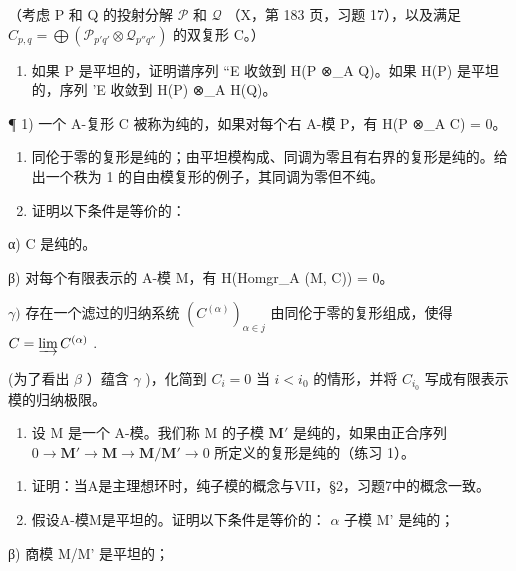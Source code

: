 （考虑 P 和 Q 的投射分解 \(\mathcal{P}\) 和 \(\mathcal{Q}\) （X，第 183 页，习题 17），以及满足 \(C_{p,q} = \bigoplus (\mathcal{P}_{p'q'} \otimes \mathcal{Q}_{p''q''})\) 的双复形 C。）

\begin{enumerate}
\def\labelenumi{\alph{enumi})}
\setcounter{enumi}{1}
\tightlist
\item
  如果 P 是平坦的，证明谱序列 ``E 收敛到 H(P ⊗\_A Q)。如果 H(P) 是平坦的，序列 'E 收敛到 H(P) ⊗\_A H(Q)。
\end{enumerate}


¶ 1) 一个 A-复形 C 被称为纯的，如果对每个右 A-模 P，有 H(P ⊗\_A C) = 0。

\begin{enumerate}
\def\labelenumi{\alph{enumi})}
\item
  同伦于零的复形是纯的；由平坦模构成、同调为零且有右界的复形是纯的。给出一个秩为 1 的自由模复形的例子，其同调为零但不纯。
\item
  证明以下条件是等价的：
\end{enumerate}

α) C 是纯的。

β) 对每个有限表示的 A-模 M，有 H(Homgr\_A (M, C)) = 0。

\(\gamma)\) 存在一个滤过的归纳系统 \((C^{(\alpha)})_{\alpha \in j}\) 由同伦于零的复形组成，使得 \(C = \varinjlim C^{(\alpha)}\) .

(为了看出 \(\beta\) ）蕴含 \(\gamma\) )，化简到 \(C_i = 0\) 当 \(i < i_0\) 的情形，并将 \(C_{i_0}\) 写成有限表示模的归纳极限。

\begin{enumerate}
\def\labelenumi{\arabic{enumi})}
\setcounter{enumi}{1}
\tightlist
\item
  设 M 是一个 A-模。我们称 M 的子模 \(\mathbf{M}'\) 是纯的，如果由正合序列 \(0 \to \mathbf{M}' \to \mathbf{M} \to \mathbf{M} / \mathbf{M}' \to 0\) 所定义的复形是纯的（练习 1）。
\end{enumerate}

\begin{enumerate}
\def\labelenumi{\alph{enumi})}
\item
  证明：当A是主理想环时，纯子模的概念与VII，§2，习题7中的概念一致。
\item
  假设A-模M是平坦的。证明以下条件是等价的： \(\alpha\) 子模 M' 是纯的；
\end{enumerate}

β) 商模 M/M' 是平坦的；

